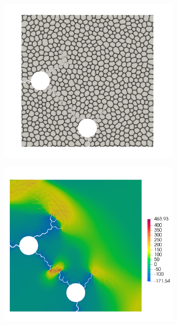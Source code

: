 \begin{figure}[htb!]
  \centering
  \begin{subfigure}[t]{0.4\linewidth}
    \centering
    \includegraphics[width=\linewidth]{Chapter3/figures/two_bubbles_bnd}
    \caption{}
  \end{subfigure}
  \begin{subfigure}[t]{0.4\linewidth}
    \centering
    \includegraphics[width=\linewidth]{Chapter3/figures/two_bubbles_stress}

\end{subfigure}
\end{figure}
